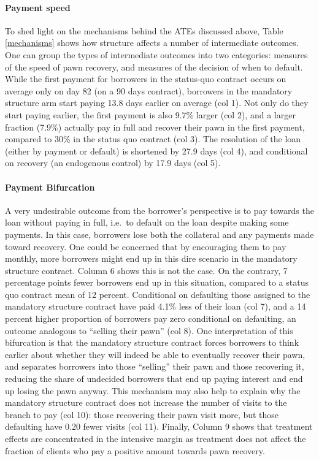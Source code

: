 \documentclass[12pt, a4paper, colorinlistoftodos]{article}
\begin{document}
\paragraph*{Payment speed} To shed light on the mechanisms behind the ATEs discussed above, Table \ref{mechanisms} shows how structure affects a number of intermediate outcomes. One can group the types of intermediate outcomes into two categories: measures of the speed of pawn recovery, and measures of the decision of when to default. While the first payment for borrowers in the status-quo contract occurs on average only on day 82 (on a 90 days contract), borrowers in the mandatory structure arm start paying 13.8 days earlier on average (col 1). Not only do they start paying earlier, the first payment is also 9.7\% larger (col 2), and a larger fraction (7.9\%)  actually pay in full and recover their pawn in the first payment, compared to 30\% in the status quo contract (col 3). The resolution of the loan (either by payment or default) is shortened by 27.9 days (col 4), and conditional on recovery (an endogenous control) by 17.9 days (col 5).

\paragraph*{Payment Bifurcation} A very undesirable outcome from the borrower's perspective is to pay towards the loan without paying in full, i.e.\ to default on the loan despite making some payments. In this case, borrowers lose both the collateral and any payments made toward recovery. One could be concerned that by encouraging them to pay monthly, more borrowers might end up in this dire scenario in the mandatory structure contract. Column 6 shows this is not the case. On the contrary, 7 percentage points fewer borrowers end up in this situation, compared to a status quo contract mean of 12 percent. Conditional on defaulting those assigned to the mandatory structure contract have paid 4.1\% less of their loan (col 7), and a 14 percent higher proportion of borrowers pay zero conditional on defaulting, an outcome analogous to
``selling their pawn'' (col 8). One interpretation of this bifurcation is that the mandatory structure contract forces borrowers to think earlier about whether they will indeed be able to eventually recover their pawn, and separates borrowers into those ``selling'' their pawn and those recovering it, reducing the share of undecided borrowers that end up paying interest and end up losing the pawn anyway. This mechanism may also help to explain why the mandatory structure contract does not increase the number of visits to the branch to pay (col 10): those recovering their pawn visit more, but those defaulting have 0.20 fewer visits (col 11). Finally, Column 9 shows that treatment effects are concentrated in the intensive margin as treatment does not affect the fraction of clients who pay a positive amount towards pawn recovery.
\end{document}
